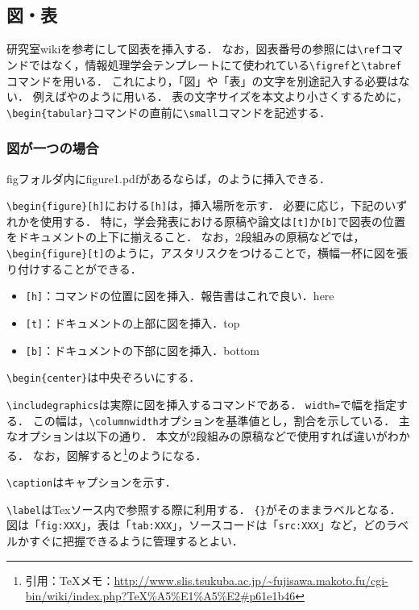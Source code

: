\documentclass[uplatex]{jsarticle}
\begin{document}
\subsection{図・表}
研究室wikiを参考にして図表を挿入する．
なお，図表番号の参照には\verb|\ref|コマンドではなく，情報処理学会テンプレートにて使われている\verb|\figref|と\verb|\tabref|コマンドを用いる．
これにより，「図」や「表」の文字を別途記入する必要はない．
例えばやのように用いる．
表の文字サイズを本文より小さくするために，\verb|\begin{tabular}|コマンドの直前に\verb|\small|コマンドを記述する．


\subsubsection{図が一つの場合}
figフォルダ内にfigure1.pdfがあるならば，のように挿入できる．

\verb|\begin{figure}[h]|における\texttt{[h]}は，挿入場所を示す．
必要に応じ，下記のいずれかを使用する．
特に，学会発表における原稿や論文は\texttt{[t]}か\texttt{[b]}で図表の位置をドキュメントの上下に揃えること．
なお，2段組みの原稿などでは，\verb|\begin{figure}[t]|のように，アスタリスクをつけることで，横幅一杯に図を張り付けすることができる．


\begin{itemize}
	\item \texttt{[h]}：コマンドの位置に図を挿入．報告書はこれで良い．here
	\item \texttt{[t]}：ドキュメントの上部に図を挿入．top
	\item \texttt{[b]}：ドキュメントの下部に図を挿入．bottom
\end{itemize}


\verb|\begin{center}|は中央ぞろいにする．

\verb|\includegraphics|は実際に図を挿入するコマンドである．
\texttt{width=}で幅を指定する．
この幅は，\verb|\columnwidth|オプションを基準値とし，割合を示している．
主なオプションは以下の通り．
本文が2段組みの原稿などで使用すれば違いがわかる．
なお，図解すると\footnote{引用：TeXメモ：\url{http://www.slis.tsukuba.ac.jp/~fujisawa.makoto.fu/cgi-bin/wiki/index.php?TeX%A5%E1%A5%E2#p61e1b46}}のようになる．

\verb|\caption|はキャプションを示す．


\verb|\label|はTexソース内で参照する際に利用する．
\verb|{}|がそのままラベルとなる．
図は「\texttt{fig:XXX}」，表は「\texttt{tab:XXX}」，ソースコードは「\texttt{src:XXX}」など，どのラベルかすぐに把握できるように管理するとよい．
\end{document}
